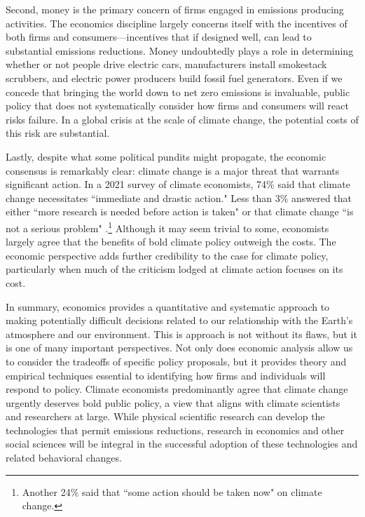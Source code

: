 Second, money is the primary concern of firms engaged in emissions producing activities. The economics discipline largely concerns itself with the incentives of both firms and consumers---incentives that if designed well, can lead to substantial emissions reductions. Money undoubtedly plays a role in determining whether or not people drive electric cars, manufacturers install smokestack scrubbers, and electric power producers build fossil fuel generators. Even if we concede that bringing the world down to net zero emissions is invaluable, public policy that does not systematically consider how firms and consumers will react risks failure. In a global crisis at the scale of climate change, the potential costs of this risk are substantial. 

Lastly, despite what some political pundits might propagate, the economic consensus is remarkably clear: climate change is a major threat that warrants significant action. In a 2021 survey of climate economists, 74\% said that climate change necessitates ``immediate and drastic action." Less than 3\% answered that either ``more research is needed before action is taken" or that climate change ``is not a serious problem" \citep{howard2021gauging}.\footnote{Another 24\% said that ``some action should be taken now" on climate change.} Although it may seem trivial to some, economists largely agree that the benefits of bold climate policy outweigh the costs. The economic perspective adds further credibility to the case for climate policy, particularly when much of the criticism lodged at climate action focuses on its cost. 

In summary, economics provides a quantitative and systematic approach to making potentially difficult decisions related to our relationship with the Earth's atmosphere and our environment. This is approach is not without its flaws, but it is one of many important perspectives. Not only does economic analysis allow us to consider the tradeoffs of specific policy proposals, but it provides theory and empirical techniques essential to identifying how firms and individuals will respond to policy. Climate economists predominantly agree that climate change urgently deserves bold public policy, a view that aligns with climate scientists and researchers at large. While physical scientific research can develop the technologies that permit emissions reductions, research in economics and other social sciences will be integral in the successful adoption of these technologies and related behavioral changes.


